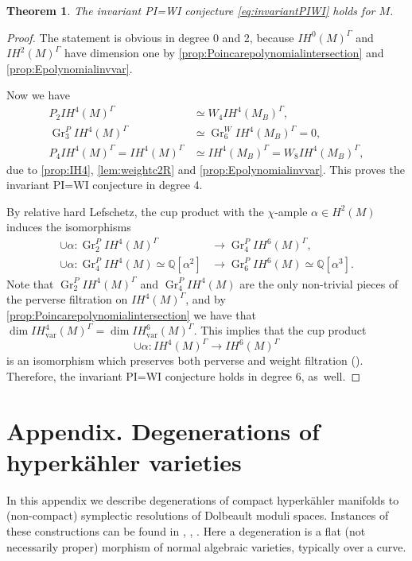 \documentclass[JEP,XML,SOM,Unicode, NoEqCountersInSection,NoFloatCountersInSection,published]{cedram}
\newcommand{\IH}{\mathit{IH}}
\newtheorem{thm}{Theorem}[section]
\theoremstyle{definition}
\newcommand{\QQ}{\mathbb{Q}}
\newcommand{\Gr}{\operatorname{Gr}}
\begin{document}
\begin{thm}\label{thm:P=Winvar}
The invariant PI=WI conjecture \eqref{eq:invariantPIWI} holds for $M$.
\end{thm}
\begin{proof}
The statement is obvious in degree 0 and 2, because $\IH^0(M)^{\Gamma}$ and $\IH^2(M)^{\Gamma}$ have dimension one by \cref{prop:Poincarepolynomialintersection} and \cref{prop:Epolynomialinvvar}.

Now we have
\begin{align*}
P_2 \IH^4(M)^{\Gamma} & \simeq W_4 \IH^4(M_B)^{\Gamma},\\
\Gr^P_3 \IH^4(M)^{\Gamma} & \simeq \Gr^W_6 \IH^4(M_B)^{\Gamma} = 0, \\
P_4 \IH^4(M)^{\Gamma} = \IH^4(M)^{\Gamma} & \simeq \IH^4(M_B)^{\Gamma} = W_8 \IH^4(M_B)^{\Gamma},
\end{align*}
due to \cref{prop:IH4}, \cref{lem:weightc2R} and \cref{prop:Epolynomialinvvar}. This proves the invariant PI=WI conjecture in degree 4.

By relative hard Lefschetz, the cup product with the $\chi$-ample $\alpha \in H^{2}(M)$
induces the isomorphisms
\begin{align*}
\cup \alpha\colon \Gr^P_2 \IH^4(M)^{\Gamma} & \to \Gr^P_4 \IH^6(M)^{\Gamma},\\
\cup \alpha\colon \Gr^P_4 \IH^4(M) \simeq \QQ [\alpha^2] & \to \Gr^P_6 \IH^6(M) \simeq \QQ [\alpha^3].
\end{align*}
Note that $\Gr^P_2 \IH^4(M)^{\Gamma}$ and $\Gr^P_4 \IH^4(M)$ are the only non-trivial pieces of the perverse filtration on $\IH^4(M)^{\Gamma}$, and by \cref{prop:Poincarepolynomialintersection} we have that $\dim \IH_{\mathrm{var}}^4(M)^{\Gamma} = \dim \IH_{\mathrm{var}}^6(M)^{\Gamma}$.
This implies that the cup product
\[
\cup \alpha\colon \IH^4(M)^{\Gamma} \to \IH^6(M)^{\Gamma}
\]
is an isomorphism which preserves both perverse and weight filtration (\cf \cite[Lem.\,1.4.4]{deCataldoHauselMigliorini2012}). Therefore, the invariant PI=WI conjecture holds in degree $6$, as~well.
\end{proof}

\appendix
\section*{Appendix. Degenerations of hyperkähler varieties}
\label{appendix:deg}

In this appendix we describe degenerations of compact hyperkähler manifolds to (non-compact) symplectic resolutions of Dolbeault moduli spaces. Instances of these constructions can be found in \cite{DEL97}, \cite{deCataldoMaulikShen2019}, \cite{deCataldoMaulikShen2020}. Here a degeneration is a flat (not necessarily proper) morphism of normal algebraic varieties, typically over a curve.
\end{document}
